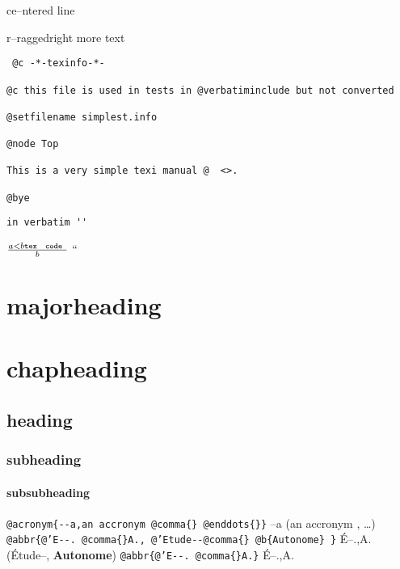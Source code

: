 \documentclass{book}
\newcommand{\Texinfoplaceholder}[1]{}
\newcommand{\Texinfonopagebreakheading}[2]{{\let\clearpage\relax \let\cleardoublepage\relax \let\thispagestyle\Texinfoplaceholder #1{#2}}}
\renewcommand{\_}{\Texinfounderscore\discretionary{}{}{}}
\begin{document}
\begin{center}
ce--ntered line
\end{center}

\begin{flushleft}
r--raggedright
more text
\end{flushleft}

\begin{verbatim}
 @c -*-texinfo-*-

@c this file is used in tests in @verbatiminclude but not converted

@setfilename simplest.info

@node Top

This is a very simple texi manual @  <>.

@bye
\end{verbatim}

\begin{verbatim}
in verbatim ''
\end{verbatim}





$\frac{a < b \texttt{tex \hbox{ code }}}{b}$ ``

\Texinfonopagebreakheading{\chapter*}{{majorheading}}

\Texinfonopagebreakheading{\chapter*}{{chapheading}}

\section*{{heading}}

\subsection*{{subheading}}

\subsubsection*{{subsubheading}}


\texttt{@acronym\{{-}{-}a,an accronym @comma\{\}\ @enddots\{\}\}} --a (an accronym , \dots{})
\texttt{@abbr\{@'E{-}{-}.\ @comma\{\}A.,\ @'Etude{-}{-}@comma\{\}\ @b\{Autonome\}\ \}} \'{E}--.\@ ,A.\@ (\'{E}tude--, \textbf{Autonome})
\texttt{@abbr\{@'E{-}{-}.\ @comma\{\}A.\}} \'{E}--.\@ ,A.\@
\end{document}
